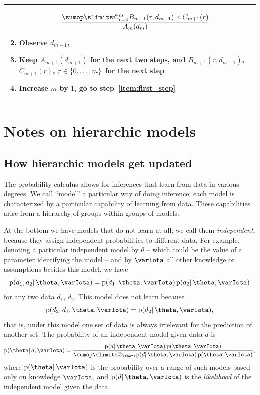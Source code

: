 \documentclass[\ifafour a4paper,12pt,\else a5paper,10pt,\fi%
onecolumn,oneside,article,%
british%
]{memoir}
\makeatletter
\theoremstyle{remark}
\theoremstyle{innote}
\def\sum{\DOTSI\sumop\slimits@}
\DeclarePairedDelimiter\set{\{}{\}}
\newcommand*{\pf}{\mathrm{p}}%
\renewcommand*{\|}{\mathpunct{|}}
\newcommand*{\yI}{\varIota}
\newcommand*{\yth}{\theta}
\makeatother
\begin{document}
\begin{table}[!b]
\begin{tabularx}{\textwidth}{X}
\begin{enumerate}
\[\begin{multlined}[][0.85\textwidth]
    \frac{\sum_{r=0}^{m} B_{m+1}(r,d_{m+1}) \times
      C_{m+1}(r)}{A_{m}(d_{m})}
  \end{multlined}
\]
\item Observe $d_{m+1}$, 
\item Keep $A_{m+1}(d_{m+1})$ for the next two steps, and
  $B_{m+1}(r,d_{m+1})$, $C_{m+1}(r)$, $r\in\set{0,\dotsc,m}$ for the next step
\item Increase $m$ by $1$, go to step~\ref{item:first_step}
  \end{enumerate}
  \\\hline
\end{tabularx}
\end{table}

\clearpage

\section{Notes on hierarchic models}
\label{sec:notes_hierarchic}

\subsection{How hierarchic models get updated}
\label{sec:hierarchic_models}

The probability calculus allows for inferences that learn from data in
various degrees. We call \enquote{model} a particular way of doing
inference; each model is characterized by a particular capability of
learning from data. These capabilities arise from a hierarchy of groups
within groups of models.

At the bottom we have models that do not learn at all; we call them
\emph{independent}, because they assign independent probabilities to
different data. For example, denoting a particular independent model by
$\yth$ -- which could be the value of a parameter identifying the model --
and by $\yI$ all other knowledge or assumptions besides this model, we have
\begin{equation}
  \label{eq:indep_model}
  \pf(d_1,d_2 \| \yth, \yI) = \pf(d_1 \|\yth,\yI) \, \pf(d_2 \|\yth,\yI)
\end{equation}
for any two data $d_1$, $d_2$. This model does not learn because
\begin{equation}
  \label{eq:indep_model_nolearn}
  \pf(d_2\| d_1, \yth, \yI) = \pf(d_2 \|\yth,\yI),
\end{equation}
that is, under this model one set of data is always irrelevant for the
prediction of another set. The probability of an independent model given
data $d$ is
\begin{equation}
  \label{eq:prob_indep_model}
  \pf(\yth \| d, \yI)
  = \frac{
    \pf(d \|\yth,\yI) \, \pf(\yth \| \yI)
  }{
    \sum_{\yth}\pf(d \|\yth,\yI) \, \pf(\yth \| \yI)
  },
\end{equation}
where $\pf(\yth \|\yI)$ is the probability over a range of such models
based only on knowledge $\yI$, and $\pf(d \|\yth,\yI)$ is the
\emph{likelihood} of the independent model given the data.
\end{document}
